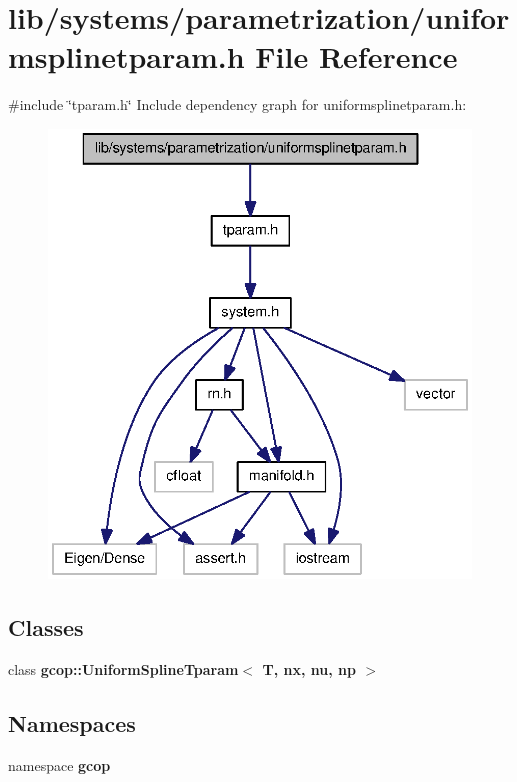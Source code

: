 \section{lib/systems/parametrization/uniformsplinetparam.h \-File \-Reference}
\label{uniformsplinetparam_8h}
{\ttfamily \#include \char`\"{}tparam.\-h\char`\"{}}\*
\-Include dependency graph for uniformsplinetparam.\-h\-:\nopagebreak
\begin{figure}[H]
\begin{center}
\leavevmode
\includegraphics[width=336pt]{uniformsplinetparam_8h__incl}
\end{center}
\end{figure}
\subsection*{\-Classes}
\begin{DoxyCompactItemize}
\item 
class {\bf gcop\-::\-Uniform\-Spline\-Tparam$<$ T, nx, nu, np $>$}
\end{DoxyCompactItemize}
\subsection*{\-Namespaces}
\begin{DoxyCompactItemize}
\item 
namespace {\bf gcop}
\end{DoxyCompactItemize}
